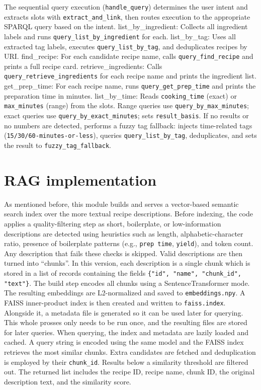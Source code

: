 \documentclass{article}
\begin{document}
The sequential query execution (\texttt{handle\_query}) determines the user intent and extracts slots with \texttt{extract\_and\_link}, then routes execution to the appropriate SPARQL query based on the intent. list\_by\_ingredient: Collects all ingredient labels and runs \texttt{query\_list\_by\_ingredient} for each. list\_by\_tag: Uses all extracted tag labels, executes \texttt{query\_list\_by\_tag}, and deduplicates recipes by URI. find\_recipe: For each candidate recipe name, calls \texttt{query\_find\_recipe} and prints a full recipe card. retrieve\_ingredients: Calls \texttt{query\_retrieve\_ingredients} for each recipe name and prints the ingredient list. get\_prep\_time: For each recipe name, runs \texttt{query\_get\_prep\_time} and prints the preparation time in minutes. list\_by\_time: Reads \texttt{cooking\_time} (exact) or \texttt{max\_minutes} (range) from the slots. Range queries use \texttt{query\_by\_max\_minutes}; exact queries use \texttt{query\_by\_exact\_minutes}; sets \texttt{result\_basis}. If no results or no numbers are detected, performs a fuzzy tag fallback: injects time-related tags (\texttt{15/30/60-minutes-or-less}), queries \texttt{query\_list\_by\_tag}, deduplicates, and sets the result to \texttt{fuzzy\_tag\_fallback}.


\section{RAG implementation}


As mentioned before, this module builds and serves a vector-based semantic search index over the more textual recipe descriptions. Before indexing, the code applies a quality-filtering step as short, boilerplate, or low-information descriptions are detected using heuristics such as length, alphabetic-character ratio, presence of boilerplate patterns (e.g., \verb|prep time|, \verb|yield|), and token count. Any description that fails these checks is skipped. Valid descriptions are then turned into “chunks”. 
In this version, each description is a single chunk which is stored in a list of records containing the fields \verb|{"id", "name", "chunk_id", "text"}|.
The build step encodes all chunks using a SentenceTransformer \cite{sentence_transformers_sbert} mode. The resulting embeddings are L2-normalized and saved to \verb|embeddings.npy|. A FAISS inner-product index is then created and written to \verb|faiss.index|. Alongside it, a metadata file is generated so it can be used later for querying. This whole prosses only needs to be run once, and the resulting files are stored for later queries.
When querying, the index and metadata are lazily loaded and cached. A query string is encoded using the same model and the FAISS index retrieves the most similar chunks. Extra candidates are fetched and deduplication is employed by their \verb|chunk_id|. Results below a similarity threshold are filtered out. The returned list includes the recipe ID, recipe name, chunk ID, the original description text, and the similarity score. 
\end{document}
